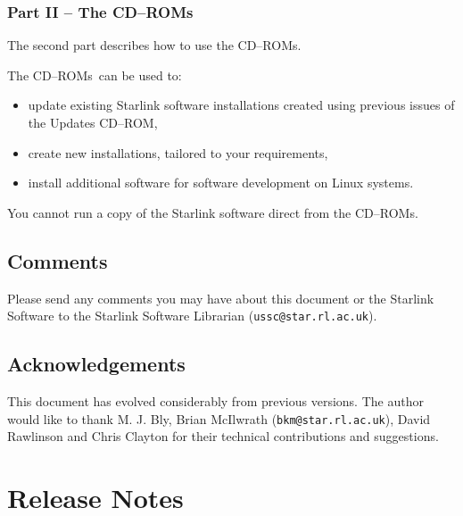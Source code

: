 \documentclass[twoside,11pt]{article}
\newcommand{\htmladdnormallink}[2]{#1}
\newcommand{\xlabel}[1]{}
\renewcommand{\_}{\texttt{\symbol{95}}}
\newcommand{\cdrom}{CD--ROM}
\newcommand{\cdrom}{CD-ROM}
\newcommand{\cdroms}{CD--ROMs}
\newcommand{\cdroms}{CD-ROMs}
\begin{document}

\subsubsection{Part II -- The \cdroms}

The second part describes how to use the \cdroms.

The \cdroms\ can be used to:

\begin{itemize}
\item update existing Starlink software installations created using previous
issues of the Updates \cdrom,
\item create new installations, tailored to your requirements,
\item install additional software for software development on Linux systems.
\end{itemize}

You cannot run a copy of the Starlink software direct from the \cdroms.


\subsection{\xlabel{comments}Comments}
\label{comments}

Please send any comments you may have about this document or the Starlink
Software to the Starlink Software Librarian
(\htmladdnormallink{\texttt{ussc@star.rl.ac.uk}}{mailto:ussc@star.rl.ac.uk}).

\subsection{\xlabel{acknowledgments}\label{acknowledgements}Acknowledgements}

This document has evolved considerably from previous versions.  The author
would like to thank M. J. Bly, Brian McIlwrath (\texttt{bkm@star.rl.ac.uk}), David
Rawlinson and Chris Clayton for their technical contributions and suggestions.


\newpage
\section{\xlabel{Release Notes}Release Notes}
\label{Release_Notes}
\end{document}
